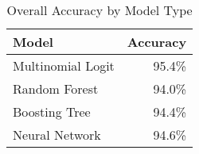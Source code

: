 \begin{table}[ht]
\centering
\caption{Overall Accuracy by Model Type}
\label{tab:overall}
\begin{tabular}{l|r}
 \hline
 \textbf{Model} & \textbf{Accuracy} \\
 \hline
 Multinomial Logit & 95.4\% \\
 Random Forest & 94.0\% \\
 Boosting Tree & 94.4\% \\
 \hline
 Neural Network & 94.6\% \\
 \hline
\end{tabular}
\end{table}
